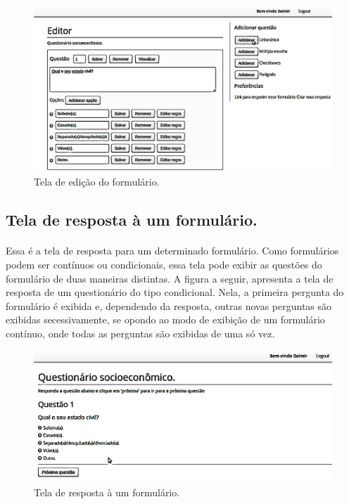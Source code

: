 \documentclass[11pt]{article}
\begin{document}
    \begin{figure}[h!]
      \centering
      \includegraphics[width=.9\textwidth]{editor.png}
      \caption{Tela de edição do formulário.}
    \end{figure}
        
  \clearpage
    
    \subsection{Tela de resposta à um formulário.}
    
    \paragraph{}
    Essa é a tela de resposta para um determinado formulário. Como formulários
    podem ser contínuos ou condicionais, essa tela pode exibir as questões 
    do formulário de duas maneiras distintas. A figura a seguir, apresenta
    a tela de resposta de um questionário do tipo condicional. Nela, 
    a primeira pergunta do formulário é exibida e, dependendo da resposta, 
    outras novas perguntas são exibidas secessivamente, se opondo ao modo de exibição de um 
    formulário contínuo, onde todas as perguntas são exibidas de uma só vez.
        
    \begin{figure}[h!]
      \centering
      \includegraphics[width=.9\textwidth]{reply_a_form.png}
      \caption{Tela de resposta à um formulário.}
    \end{figure}
    
\end{document}
